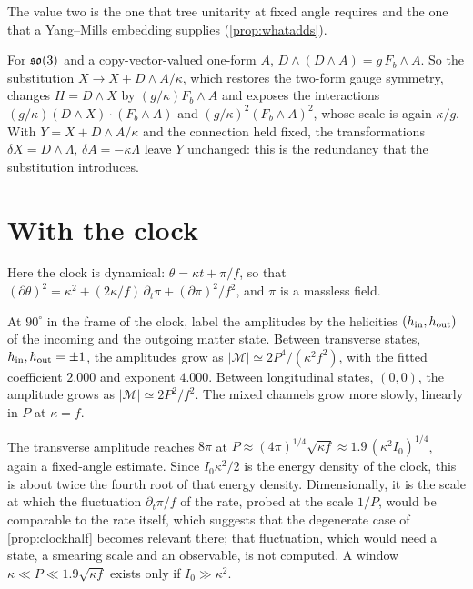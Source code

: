 The value two is the one that tree unitarity at fixed angle requires \cite{FerraraPorratiTelegdi92} and the one that a Yang--Mills
embedding supplies (\cref{prop:whatadds}).

\begin{proposition}
\label{prop:stueck}
For $\mathfrak{so}(3)$ and a copy-vector-valued one-form $A$, $D\wedge(D\wedge A)=g\,F_b\wedge A$. So the substitution $X\to X+D\wedge A/\kappa$, which
restores the two-form gauge symmetry, changes $H=D\wedge X$ by $(g/\kappa)F_b\wedge A$ and exposes the interactions
$(g/\kappa)(D\wedge X)\cdot(F_b\wedge A)$ and $(g/\kappa)^2(F_b\wedge A)^2$, whose scale is again $\kappa/g$. With $Y=X+D\wedge A/\kappa$
and the connection held fixed, the transformations $\delta X=D\wedge\Lambda$, $\delta A=-\kappa\Lambda$ leave $Y$ unchanged: this is the
redundancy that the substitution introduces.
\end{proposition}

\section{With the clock}
\label{sec:clockamp}

Here the clock is dynamical: $\theta=\kappa t+\pi/f$, so that $(\partial\theta)^2=\kappa^2+(2\kappa/f)\,\partial_t\pi+(\partial\pi)^2/f^2$,
and $\pi$ is a massless field.

\begin{theorem}
\label{thm:clockamp}
At $90^\circ$ in the frame of the clock, label the amplitudes by the helicities $(h_{\rm in},h_{\rm out})$ of the incoming and the outgoing
matter state. Between transverse states, $h_{\rm in},h_{\rm out}=\pm1$, the amplitudes grow as $|\mathcal M|\simeq2P^4/(\kappa^2f^2)$, with
the fitted coefficient $2.000$ and exponent $4.000$. Between longitudinal states, $(0,0)$, the amplitude grows as $|\mathcal M|\simeq2P^2/f^2$.
The mixed channels grow more slowly, linearly in $P$ at $\kappa=f$.
\end{theorem}

The transverse amplitude reaches $8\pi$ at $P\approx(4\pi)^{1/4}\sqrt{\kappa f}\approx1.9\,(\kappa^2I_0)^{1/4}$, again a fixed-angle
estimate. Since $I_0\kappa^2/2$ is the energy density of the clock, this is about twice the fourth root of that energy density.
Dimensionally, it is the scale at which the fluctuation $\partial_t\pi/f$ of the rate, probed at the scale $1/P$, would be comparable to the
rate itself, which suggests that the degenerate case of \cref{prop:clockhalf} becomes relevant there; that fluctuation, which would need a
state, a smearing scale and an observable, is not computed. A window $\kappa\ll P\ll1.9\sqrt{\kappa f}$ exists only if $I_0\gg\kappa^2$.

